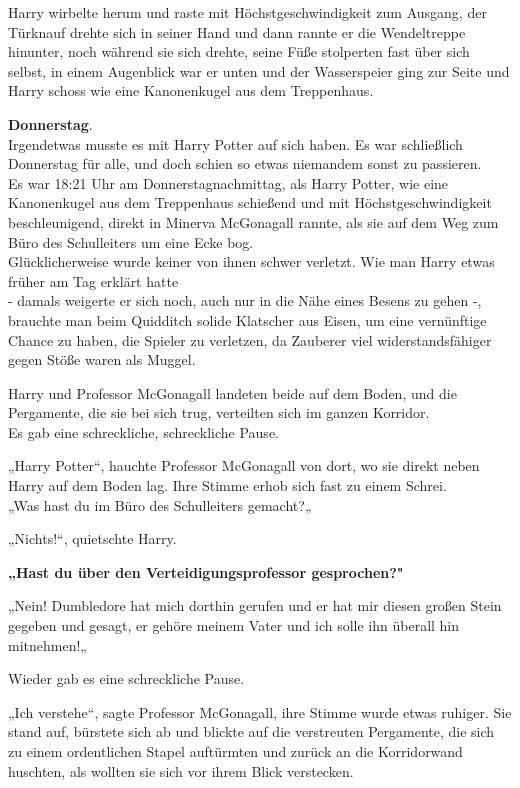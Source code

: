 {Harry wirbelte herum und raste mit Höchstgeschwindigkeit zum Ausgang, der Türknauf drehte sich in seiner Hand und dann rannte er die Wendeltreppe hinunter, noch während sie sich drehte, seine Füße stolperten fast über sich selbst, in einem Augenblick war er unten und der Wasserspeier ging zur Seite und Harry schoss wie eine Kanonenkugel aus dem Treppenhaus.

\textbf{Donnerstag}.\\ Irgendetwas musste es mit Harry Potter auf sich haben. Es war schließlich Donnerstag für alle, und doch schien so etwas niemandem sonst zu passieren.\\ Es war 18:21 Uhr am Donnerstagnachmittag, als Harry Potter, wie eine Kanonenkugel aus dem Treppenhaus schießend und mit Höchstgeschwindigkeit beschleunigend, direkt in Minerva McGonagall rannte, als sie auf dem Weg zum Büro des Schulleiters um eine Ecke bog.\\ Glücklicherweise wurde keiner von ihnen schwer verletzt. Wie man Harry etwas früher am Tag erklärt hatte\\ - damals weigerte er sich noch, auch nur in die Nähe eines Besens zu gehen -,\\ brauchte man beim Quidditch solide Klatscher aus Eisen, um eine vernünftige Chance zu haben, die Spieler zu verletzen, da Zauberer viel widerstandsfähiger gegen Stöße waren als Muggel.

Harry und Professor McGonagall landeten beide auf dem Boden, und die Pergamente, die sie bei sich trug, verteilten sich im ganzen Korridor.\\ Es gab eine schreckliche, schreckliche Pause.

„Harry Potter“, hauchte Professor McGonagall von dort, wo sie direkt neben Harry auf dem Boden lag. Ihre Stimme erhob sich fast zu einem Schrei.\\ „Was hast du im Büro des Schulleiters gemacht?„

„Nichts!“, quietschte Harry.

\textbf{„Hast du über den Verteidigungsprofessor gesprochen?"}

„Nein! Dumbledore hat mich dorthin gerufen und er hat mir diesen großen Stein gegeben und gesagt, er gehöre meinem Vater und ich solle ihn überall hin mitnehmen!„

Wieder gab es eine schreckliche Pause.

„Ich verstehe“, sagte Professor McGonagall, ihre Stimme wurde etwas ruhiger. Sie stand auf, bürstete sich ab und blickte auf die verstreuten Pergamente, die sich zu einem ordentlichen Stapel auftürmten und zurück an die Korridorwand huschten, als wollten sie sich vor ihrem Blick verstecken.

}
